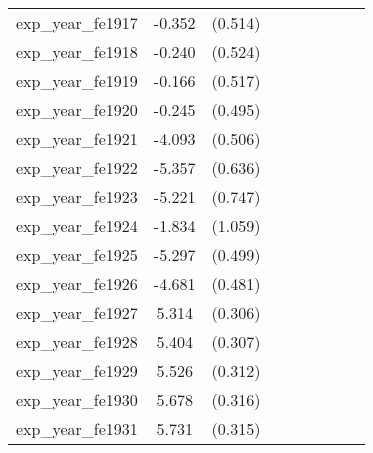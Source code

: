{\begin{tabular}{l*{4}{cc}}
exp\_year\_fe1917&   -0.352         &  (0.514)&                  &         &                  &         &                  &         \\
exp\_year\_fe1918&   -0.240         &  (0.524)&                  &         &                  &         &                  &         \\
exp\_year\_fe1919&   -0.166         &  (0.517)&                  &         &                  &         &                  &         \\
exp\_year\_fe1920&   -0.245         &  (0.495)&                  &         &                  &         &                  &         \\
exp\_year\_fe1921&   -4.093\sym{***}&  (0.506)&                  &         &                  &         &                  &         \\
exp\_year\_fe1922&   -5.357\sym{***}&  (0.636)&                  &         &                  &         &                  &         \\
exp\_year\_fe1923&   -5.221\sym{***}&  (0.747)&                  &         &                  &         &                  &         \\
exp\_year\_fe1924&   -1.834         &  (1.059)&                  &         &                  &         &                  &         \\
exp\_year\_fe1925&   -5.297\sym{***}&  (0.499)&                  &         &                  &         &                  &         \\
exp\_year\_fe1926&   -4.681\sym{***}&  (0.481)&                  &         &                  &         &                  &         \\
exp\_year\_fe1927&    5.314\sym{***}&  (0.306)&                  &         &                  &         &                  &         \\
exp\_year\_fe1928&    5.404\sym{***}&  (0.307)&                  &         &                  &         &                  &         \\
exp\_year\_fe1929&    5.526\sym{***}&  (0.312)&                  &         &                  &         &                  &         \\
exp\_year\_fe1930&    5.678\sym{***}&  (0.316)&                  &         &                  &         &                  &         \\
exp\_year\_fe1931&    5.731\sym{***}&  (0.315)&                  &         &                  &         &                  &         \\

\end{tabular}}
